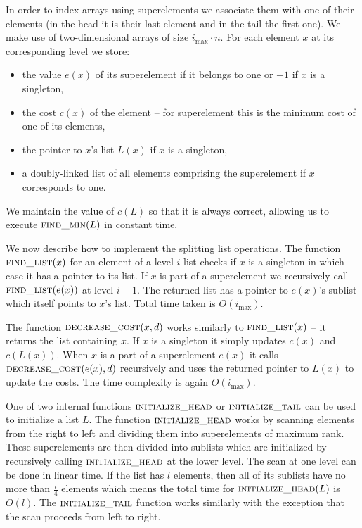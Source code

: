 In order to index arrays using superelements we associate them with one of their elements (in the head it is their last element and in the tail the first one). We make use of two-dimensional arrays of size $i_{\max} \cdot n$. For each element $x$ at its corresponding level we store:

\begin{itemize}
    \item the value $e(x)$ of its superelement if it belongs to one or $-1$ if $x$ is a singleton,
    \item the cost $c(x)$ of the element – for superelement this is the minimum cost of one of its elements,
    \item the pointer to $x$'s list $L(x)$ if $x$ is a singleton,
    \item a doubly-linked list of all elements comprising the superelement if $x$ corresponds to one.
\end{itemize}

We maintain the value of $c(L)$ so that it is always correct, allowing us to execute $\textsc{find\_min}(L)$ in constant time.

We now describe how to implement the splitting list operations. The function $\textsc{find\_list}(x)$ for an element of a level $i$ list checks if $x$ is a singleton in which case it has a pointer to its list. If $x$ is part of a superelement we recursively call $\textsc{find\_list}(e(x))$ at level $i-1$. The returned list has a pointer to $e(x)$'s sublist which itself points to $x$'s list. Total time taken is $O(i_{\max})$.

The function $\textsc{decrease\_cost}(x, d)$ works similarly to $\textsc{find\_list}(x)$ – it returns the list containing $x$. If $x$ is a singleton it simply updates $c(x)$ and $c(L(x))$. When $x$ is a part of a superelement $e(x)$ it calls $\textsc{decrease\_cost}(e(x), d)$ recursively and uses the returned pointer to $L(x)$ to update the costs. The time complexity is again $O(i_{\max})$.

One of two internal functions $\textsc{initialize\_head}$ or $\textsc{initialize\_tail}$ can be used to initialize a list $L$. The function $\textsc{initialize\_head}$ works by scanning elements from the right to left and dividing them into superelements of maximum rank. These superelements are then divided into sublists which are initialized by recursively calling $\textsc{initialize\_head}$ at the lower level. The scan at one level can be done in linear time. If the list has $l$ elements, then all of its sublists have no more than $\frac{l}{4}$ elements which means the total time for $\textsc{initialize\_head}(L)$ is $O(l)$. The $\textsc{initialize\_tail}$ function works similarly with the exception that the scan proceeds from left to right.


